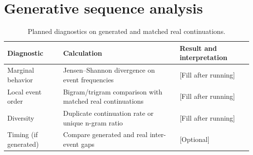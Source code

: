 \section{Generative sequence analysis}

\begin{table}[htbp]
\centering\small
\begin{tabularx}{\linewidth}{@{}lXX@{}}
\toprule
Diagnostic & Calculation & Result and interpretation \\
\midrule
Marginal behavior & Jensen--Shannon divergence on event frequencies & [Fill after running] \\
Local event order & Bigram/trigram comparison with matched real continuations & [Fill after running] \\
Diversity & Duplicate continuation rate or unique n-gram ratio & [Fill after running] \\
Timing (if generated) & Compare generated and real inter-event gaps & [Optional] \\
\bottomrule
\end{tabularx}
\caption{Planned diagnostics on generated and matched real continuations.}
\end{table}
